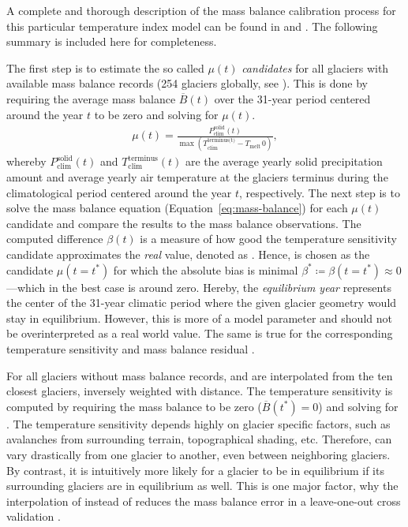             A complete and thorough description of the mass balance calibration process for this particular temperature index model can be found in \citet[Section 2.1.9-10]{Marzeion2012b} and \citet[][Section 3.3]{Maussion2019}. The following summary is included here for completeness.
            
            The first step is to estimate the so called $\mu(t)$ \emph{candidates} for all glaciers with available mass balance records (254 glaciers globally, see \citet{WGMS2017}). This is done by requiring the average mass balance $\overline B(t)$ over the 31-year period centered around the year $t$ to be zero and solving for $\mu(t)$.
            \begin{align}\label{eq:mu-candidates}
                \mu(t) = \frac{P_\text{clim}^\text{solid}(t)}{\max(T_\text{clim}^\text{terminus(t)} - T_\text{melt}\, 0)},
            \end{align}
            whereby $P_{\text{clim}}^{\text{solid}}(t)$ and $T_{\text{clim}}^{\text{terminus}}(t)$ are the average yearly solid precipitation amount and average yearly air temperature at the glaciers terminus during the climatological period centered around the year $t$, respectively. The next step is to solve the mass balance equation (Equation~\ref{eq:mass-balance}) for each $\mu(t)$ candidate and compare the results to the mass balance observations. The computed difference $\beta(t)$ is a measure of how good the temperature sensitivity candidate approximates the \textit{real} value, denoted as \mustar{}. Hence, \mustar{} is chosen as the candidate $\mu(t = t^*)$ for which the absolute bias is minimal $\beta^* \coloneqq \beta(t = t^*) \approx 0$---which in the best case is around zero. Hereby, the \textit{equilibrium year} \tstar{} represents the center of the 31-year climatic period where the given glacier geometry would stay in equilibrium. However, this is more of a model parameter and should not be overinterpreted as a real world value. The same is true for the corresponding temperature sensitivity \mustar{} and mass balance residual \bias{}.

            For all glaciers without mass balance records, \tstar{} and \bias{} are interpolated from the ten closest glaciers, inversely weighted with distance. The temperature sensitivity is computed by requiring the mass balance to be zero ($\overline B(t^*) = 0$) and solving for \mustar{}. The temperature sensitivity \mustar{} depends highly on glacier specific factors, such as avalanches from surrounding terrain, topographical shading, etc. Therefore, \mustar{} can vary drastically from one glacier to another, even between neighboring glaciers. By contrast, it is intuitively more likely for a glacier to be in equilibrium if its surrounding glaciers are in equilibrium as well. This is one major factor, why the interpolation of \tstar{} instead of \mustar{} reduces the mass balance error in a leave-one-out cross validation \citep[cf.][]{Marzeion2012b, Maussion2019}.

